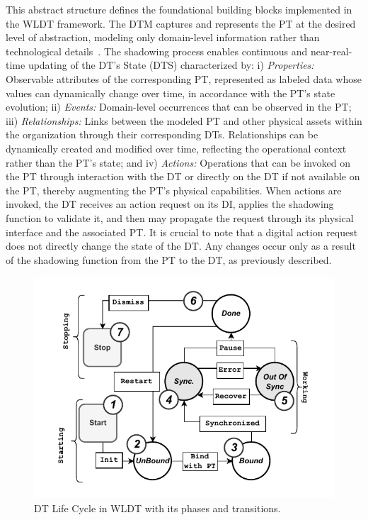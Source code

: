 This abstract structure defines the foundational building blocks implemented in the WLDT framework. The DTM captures and represents the PT at the desired level of abstraction, modeling only domain-level information rather than technological details~\cite{dt-IoT-context-Minerva-2020}.
The shadowing process enables continuous and near-real-time updating of the DT's State (DTS) characterized by: i) \textit{Properties:} Observable attributes of the corresponding PT, represented as labeled data whose values can dynamically change over time, in accordance with the PT's state evolution;
ii) \textit{Events:} Domain-level occurrences that can be observed in the PT;
iii) \textit{Relationships:} Links between the modeled PT and other physical assets within the organization through their corresponding DTs. Relationships can be dynamically created and modified over time, reflecting the operational context rather than the PT's state;
and iv) \textit{Actions:} Operations that can be invoked on the PT through interaction with the DT or directly on the DT if not available on the PT, thereby augmenting the PT's physical capabilities.
When actions are invoked, the DT receives an action request on its DI, applies the shadowing function to validate it, and then may propagate the request through its physical interface and the associated PT.
It is crucial to note that a digital action request does not directly change the state of the DT.
Any changes occur only as a result of the shadowing function from the PT to the DT, as previously described. 


\begin{figure}[t]
    \setlength{\belowcaptionskip}{-13pt}
    \centering
    \includegraphics[width=\columnwidth]{figures/engineering-wldt/wldt_lifecycle_simple.pdf}
    \caption{DT Life Cycle in WLDT with its phases and transitions.}
    \label{fig:wldt_life_cycle}
\end{figure}

